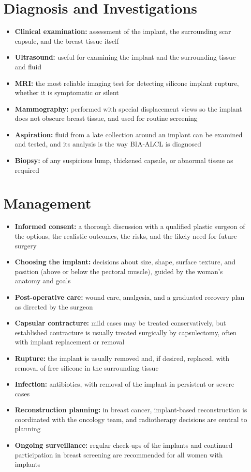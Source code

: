 \section*{Diagnosis and Investigations}
\begin{itemize}
    \item \textbf{Clinical examination:} assessment of the implant, the surrounding scar capsule, and the breast tissue itself
    \item \textbf{Ultrasound:} useful for examining the implant and the surrounding tissue and fluid
    \item \textbf{MRI:} the most reliable imaging test for detecting silicone implant rupture, whether it is symptomatic or silent
    \item \textbf{Mammography:} performed with special displacement views so the implant does not obscure breast tissue, and used for routine screening
    \item \textbf{Aspiration:} fluid from a late collection around an implant can be examined and tested, and its analysis is the way BIA-ALCL is diagnosed
    \item \textbf{Biopsy:} of any suspicious lump, thickened capsule, or abnormal tissue as required
\end{itemize}

\section*{Management}
\begin{itemize}
    \item \textbf{Informed consent:} a thorough discussion with a qualified plastic surgeon of the options, the realistic outcomes, the risks, and the likely need for future surgery
    \item \textbf{Choosing the implant:} decisions about size, shape, surface texture, and position (above or below the pectoral muscle), guided by the woman's anatomy and goals
    \item \textbf{Post-operative care:} wound care, analgesia, and a graduated recovery plan as directed by the surgeon
    \item \textbf{Capsular contracture:} mild cases may be treated conservatively, but established contracture is usually treated surgically by capsulectomy, often with implant replacement or removal
    \item \textbf{Rupture:} the implant is usually removed and, if desired, replaced, with removal of free silicone in the surrounding tissue
    \item \textbf{Infection:} antibiotics, with removal of the implant in persistent or severe cases
    \item \textbf{Reconstruction planning:} in breast cancer, implant-based reconstruction is coordinated with the oncology team, and radiotherapy decisions are central to planning
    \item \textbf{Ongoing surveillance:} regular check-ups of the implants and continued participation in breast screening are recommended for all women with implants
\end{itemize}

